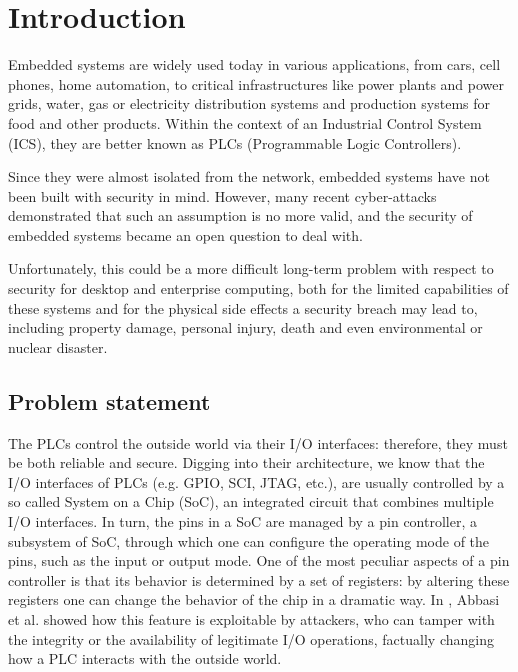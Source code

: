 \chapter{Introduction}
\label{chap:intro}

Embedded systems are widely used today in various applications, from cars, cell phones, home automation, to critical infrastructures
like power plants and power grids, water, gas or electricity distribution systems and production systems for food and other products.
Within the context of an Industrial Control System (ICS), they are better known as PLCs (Programmable Logic Controllers).

Since they were almost isolated from the network, embedded systems have not been built with security in mind.
However, many recent cyber-attacks demonstrated that such an assumption is no more valid, and the security of embedded systems became an open question to deal with.

Unfortunately, this could be a more difficult long-term problem with respect to security for desktop and enterprise computing,
both for the limited capabilities of these systems and for the physical side effects a security breach may lead to, including property damage, personal injury, death and
even environmental or nuclear disaster.


\section{Problem statement}

The PLCs control the outside world via their I/O interfaces: therefore, they must be both reliable and secure.
Digging into their architecture, we know that the I/O interfaces of PLCs (e.g. GPIO, SCI, JTAG, etc.),
are usually controlled by a so called System on a Chip (SoC), an integrated circuit that combines multiple I/O interfaces.
In turn, the pins in a SoC are managed by a pin controller, a subsystem of SoC, through which one can configure the operating mode of the pins, such as the input or output mode.
One of the most peculiar aspects of a pin controller is that its behavior is determined by a set of registers: by altering these registers one can change the behavior
of the chip in a dramatic way. In \cite{ghostplc}, Abbasi et al. showed how this feature is exploitable by attackers, who can tamper with
the integrity or the availability of legitimate I/O operations, factually changing how a PLC interacts with the outside world.

